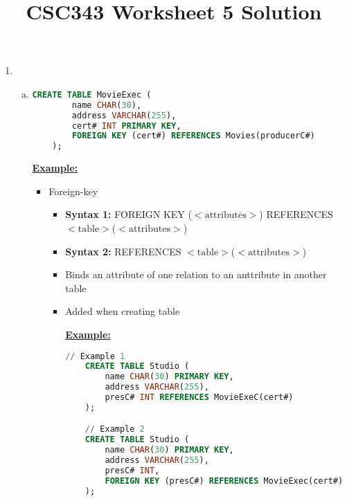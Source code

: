 \documentclass[12pt]{article}
\begin{document}
\title{CSC343 Worksheet 5 Solution}
\maketitle

\begin{enumerate}[1.]
    \item

    \begin{enumerate}[a)]
        \item

    \begin{lstlisting}[language=SQL]
    CREATE TABLE MovieExec (
        name CHAR(30),
        address VARCHAR(255),
        cert# INT PRIMARY KEY,
        FOREIGN KEY (cert#) REFERENCES Movies(producerC#)
    );
    \end{lstlisting}

        \bigskip

        \underline{\textbf{Example:}}

        \bigskip

        \begin{itemize}
            \item Foreign-key
            \begin{itemize}
                \item \textbf{Syntax 1:} FOREIGN KEY ($<\text{attributes}>$) REFERENCES $<\text{table}>$($<\text{attributes}>$)
                \item \textbf{Syntax 2:} REFERENCES $<\text{table}>$($<\text{attributes}>$)
                \item Binds an attribute of one relation to an anttribute in another table
                \item Added when creating table

                \bigskip

                \underline{\textbf{Example:}}

                \bigskip

    \begin{lstlisting}[language=SQL]
    // Example 1
    CREATE TABLE Studio (
        name CHAR(30) PRIMARY KEY,
        address VARCHAR(255),
        presC# INT REFERENCES MovieExeC(cert#)
    );

    // Example 2
    CREATE TABLE Studio (
        name CHAR(30) PRIMARY KEY,
        address VARCHAR(255),
        presC# INT,
        FOREIGN KEY (presC#) REFERENCES MovieExec(cert#)
    );
    \end{lstlisting}
            \end{itemize}
        \end{itemize}


\end{enumerate}
\end{enumerate}
\end{document}
